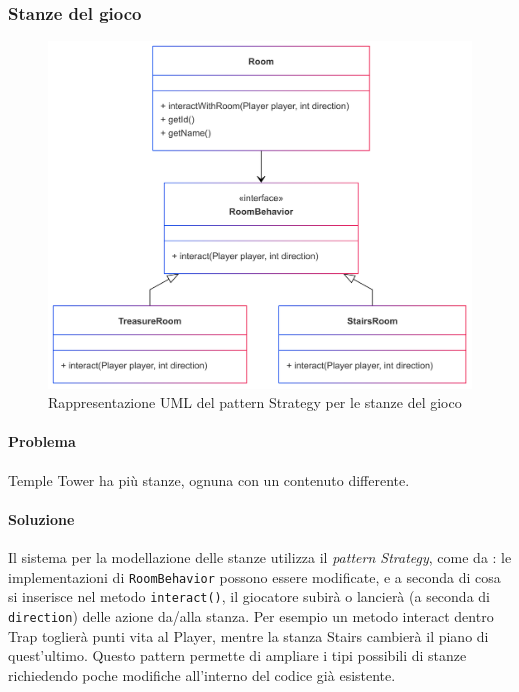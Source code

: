 \documentclass[a4paper,12pt]{report}
\begin{document}
\subsubsection{Stanze del gioco}

\begin{figure}[H]
\centering{}
\includegraphics[width=\textwidth]{img/behavior.png}
\caption{Rappresentazione UML del pattern Strategy per le stanze del gioco}
\label{img:rooms}
\end{figure}

\paragraph{Problema} Temple Tower ha più stanze, ognuna con un contenuto differente.

\paragraph{Soluzione} Il sistema per la modellazione delle stanze utilizza il \textit{pattern Strategy}, come da
: le implementazioni di \texttt{RoomBehavior} possono essere modificate, e a seconda di cosa si inserisce nel metodo
%
\texttt{interact()}, il giocatore subirà o lancierà (a seconda di \texttt{direction}) delle azione da/alla stanza.
%
Per esempio un metodo interact dentro Trap toglierà punti vita al Player, mentre la stanza Stairs cambierà il piano di quest'ultimo.
%
Questo pattern permette di ampliare i tipi possibili di stanze richiedendo poche modifiche all'interno del codice già esistente. 
\end{document}
